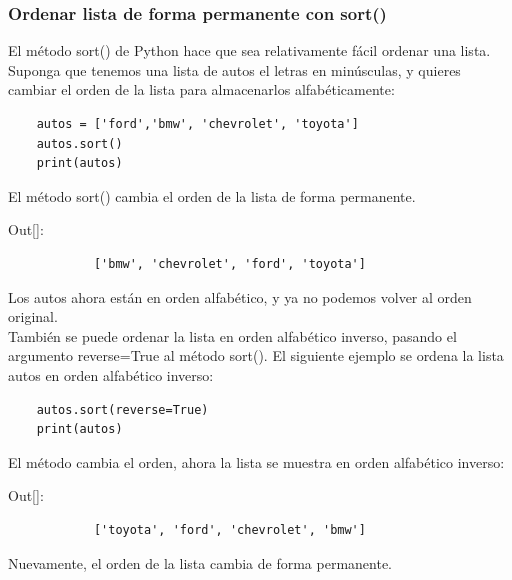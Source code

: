 \subsubsection{Ordenar lista de forma permanente con {\ttfamily sort()}} 

El método {\ttfamily sort()}  de Python hace que sea relativamente fácil ordenar una lista. Suponga  que tenemos una lista de autos el letras en minúsculas, y quieres cambiar el orden de la lista para almacenarlos alfabéticamente:

\hspace{-2.1cm}{\ttfamily \scriptsize autos.py}\vspace{-0.56cm}
\begin{lstlisting}	
	autos = ['ford','bmw', 'chevrolet', 'toyota']
	autos.sort()
	print(autos)
\end{lstlisting}	

El método {\ttfamily sort()}  cambia el orden de la lista de forma permanente.

{\ttfamily\scriptsize\scriptsize 
	\hspace{-0.65cm}Out[]:\vspace{-0.3cm}	
	{\color{blue} 	
		\begin{verbatim}
			['bmw', 'chevrolet', 'ford', 'toyota']
		\end{verbatim}
}}

\noindent Los autos ahora están en orden alfabético, y ya no podemos volver al orden original.\\


También se  puede ordenar la lista en orden alfabético inverso, pasando el
argumento {\ttfamily reverse=True} al método {\ttfamily sort()}. El siguiente ejemplo se ordena
la lista autos en orden alfabético inverso:
\begin{lstlisting}	
	autos.sort(reverse=True)
	print(autos)
\end{lstlisting}	

\noindent El método cambia el orden, ahora la lista se muestra en orden alfabético inverso:\\

{\ttfamily\scriptsize\scriptsize 
	\hspace{-0.65cm}Out[]:\vspace{-0.3cm}	
	{\color{blue} 	
		\begin{verbatim}	
			['toyota', 'ford', 'chevrolet', 'bmw']
		\end{verbatim}
}}
\noindent Nuevamente, el orden de la lista cambia de forma  permanente.



